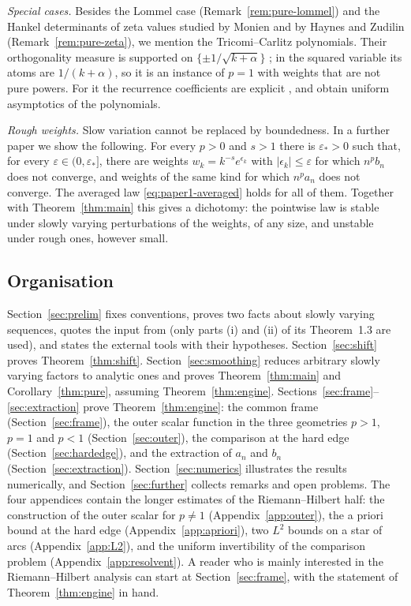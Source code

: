 \emph{Special cases.} Besides the Lommel case (Remark~\ref{rem:pure-lommel}) and the Hankel determinants of zeta
values studied by Monien \cite{Monien} and by Haynes and Zudilin \cite{HaynesZudilin} (Remark~\ref{rem:pure-zeta}), we
mention the Tricomi--Carlitz polynomials. Their orthogonality
measure is supported on $\{\pm1/\sqrt{k+\alpha}\}$ \cite[\S3]{VA}; in the squared
variable its atoms are $1/(k+\alpha)$, so it is an instance of $p=1$ with weights that are not pure powers. For it the
recurrence coefficients are explicit \cite[\S3]{VA}, and \cite{WLXZ} obtain uniform asymptotics of the polynomials.

\emph{Rough weights.} Slow variation cannot be replaced by boundedness. In a further paper \cite{Paper3} we show the
following. For every $p>0$ and $s>1$ there is $\varepsilon_*>0$ such that, for every $\varepsilon\in(0,\varepsilon_*]$,
there are weights $w_k=k^{-s}e^{\epsilon_k}$ with $|\epsilon_k|\le\varepsilon$ for which $n^pb_n$ does not converge,
and weights of the same kind for which $n^pa_n$ does not converge. The averaged law \eqref{eq:paper1-averaged} holds
for all of them. Together with Theorem~\ref{thm:main} this gives a dichotomy: the pointwise law is stable under slowly
varying perturbations of the weights, of any size, and unstable under rough ones, however small.

\subsection{Organisation}\label{sec:organisation}
Section~\ref{sec:prelim} fixes conventions, proves two facts about slowly varying sequences, quotes the input from
\cite{Paper1} (only parts (i) and (ii) of its Theorem~1.3 are used), and states the external tools with their
hypotheses. Section~\ref{sec:shift} proves Theorem~\ref{thm:shift}. Section~\ref{sec:smoothing} reduces arbitrary
slowly varying factors to analytic ones and proves Theorem~\ref{thm:main} and Corollary~\ref{thm:pure}, assuming
Theorem~\ref{thm:engine}. Sections~\ref{sec:frame}--\ref{sec:extraction} prove Theorem~\ref{thm:engine}: the common
frame (Section~\ref{sec:frame}), the outer scalar function in the three geometries $p>1$, $p=1$ and $p<1$
(Section~\ref{sec:outer}), the comparison at the hard edge (Section~\ref{sec:hardedge}), and the extraction of $a_n$ and
$b_n$ (Section~\ref{sec:extraction}). Section~\ref{sec:numerics} illustrates the results numerically, and
Section~\ref{sec:further} collects remarks and open problems. The four appendices contain the longer estimates of the
Riemann--Hilbert half: the construction of the outer scalar for $p\ne1$ (Appendix~\ref{app:outer}), the a priori bound
at the hard edge (Appendix~\ref{app:apriori}), two $L^2$ bounds on a star of arcs (Appendix~\ref{app:L2}), and the
uniform invertibility of the comparison problem (Appendix~\ref{app:resolvent}). A reader who is mainly interested in the
Riemann--Hilbert analysis can start at Section~\ref{sec:frame}, with the statement of Theorem~\ref{thm:engine} in hand.

